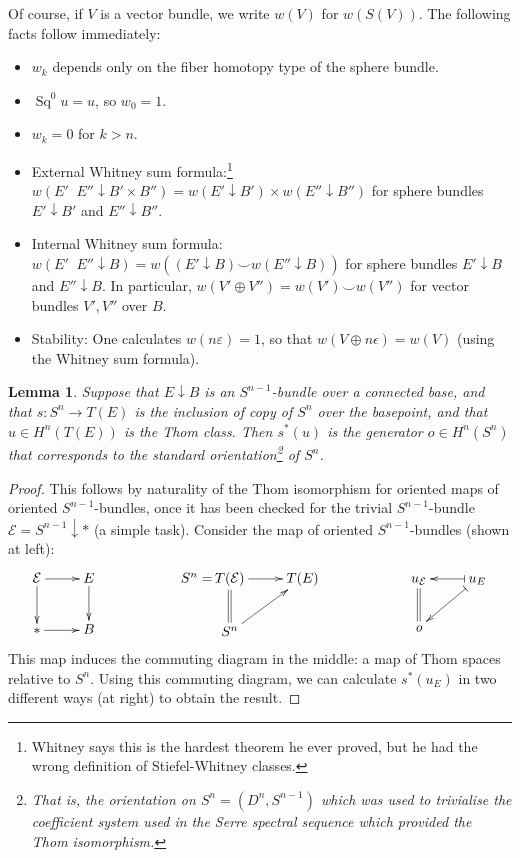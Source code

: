 \documentclass{article}
\DeclareMathOperator{\Sq}{Sq}
\renewcommand{\to}{\longrightarrow}
\newtheorem{lem}[thm]{Lemma}
\theoremstyle{definition}
\begin{document}
Of course, if $V$ is a vector bundle, we write $w(V)$ for $w(S(V))$. The following facts follow immediately:
\begin{itemize}
\item $w_k$ depends only on the fiber homotopy type of the sphere bundle.
\item $\Sq^0 u = u$, so $w_0 = 1$.
\item $w_k = 0$ for $k > n$.
\item External Whitney sum formula:\footnote{Whitney says this is the hardest theorem he ever proved, but he had the wrong definition of Stiefel-Whitney classes.} $w(E'\mathop{\widehat\ast}E''\downarrow B'\times B'')=w(E'\downarrow B')\times w(E''\downarrow B'')$ for sphere bundles $E'\downarrow B'$ and $E''\downarrow B''$.
\item Internal Whitney sum formula: $w(E'\mathop{\ast_B} E''\downarrow B)=w((E'\downarrow B)\smile w(E''\downarrow B))$ for sphere bundles $E'\downarrow B$ and $E''\downarrow B$.
In particular, $w(V'\oplus V'')=w(V')\smile w(V'')$ for vector bundles $V',V''$ over $B$.
\item Stability: One calculates $w(n\varepsilon) = 1$, so that $w(V \oplus n\epsilon) = w(V)$  (using the Whitney sum formula).
\end{itemize}
\begin{lem}\label{ThomClassLem}
Suppose that $E\downarrow B$ is an $S^{n-1}$-bundle over a connected base, and that $s:S^n\to T(E)$ is the inclusion of copy of $S^n$ over the basepoint, and that $u\in H^n(T(E))$ is the Thom class. Then $s^*(u)$ is the generator $\mathit{o}\in H^n(S^n)$ that corresponds to the standard orientation\footnote{That is, the orientation on $S^n=(D^n,S^{n-1})$ which was used to trivialise the coefficient system used in the Serre spectral sequence which provided the Thom isomorphism.} of $S^n$.
\end{lem}
\begin{proof}
This follows by naturality of the Thom isomorphism for oriented maps of oriented $S^{n-1}$-bundles, once it has been checked for the trivial $S^{n-1}$-bundle $\mathcal{E}=S^{n-1}\downarrow*$ (a simple task). Consider the map of oriented $S^{n-1}$-bundles (shown at left):
\[\xymatrix{
\mathcal{E}\ar[r]\ar[d]&E\ar[d]\\
\ast\ar[r]&B
}\qquad\qquad\qquad\qquad
{
\xymatrix{
\makebox[0mm][r]{$S^n=\,$}T(\mathcal{E})\ar[r]&T(E)\\
S^n\ar@{=}[u]\ar[ur]
}\qquad\qquad\qquad
\xymatrix{
u_\mathcal{E}\ar@{=}[d]&\ar@{|->}[l]u_E\ar@{|->}[dl]\\
\mathit{o}
}}\]
This map induces the commuting diagram in the middle: a map of Thom spaces relative to $S^n$. Using this commuting diagram, we can calculate $s^*(u_E)$ in two different ways (at right) to obtain the result.
\end{proof}
\end{document}
